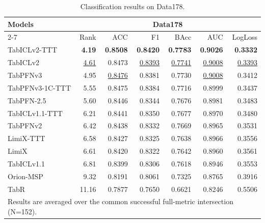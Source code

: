 \begin{table}[t]
\centering
\caption{Classification results on Data178.}
\label{tab:compare-results-all-metrics}
\begin{tabular}{lrrrrrr}
\hline
Models & \multicolumn{6}{c}{Data178} \\
\cline{2-7}
 & Rank & ACC & F1 & BAcc & AUC & LogLoss \\
\hline
TabICLv2-TTT & \textbf{4.19} & \textbf{0.8508} & \textbf{0.8420} & \textbf{0.7783} & \textbf{0.9026} & \textbf{0.3332} \\
TabICLv2 & \underline{4.61} & 0.8473 & \underline{0.8393} & \underline{0.7741} & \underline{0.9008} & \underline{0.3393} \\
TabPFNv3 & 4.95 & \underline{0.8476} & 0.8381 & 0.7730 & \underline{0.9008} & 0.3412 \\
TabPFNv3-1C-TTT & 5.55 & 0.8475 & 0.8384 & 0.7716 & 0.8999 & 0.3437 \\
TabPFN-2.5 & 5.60 & 0.8446 & 0.8344 & 0.7676 & 0.8981 & 0.3483 \\
TabICLv1.1-TTT & 6.21 & 0.8441 & 0.8350 & 0.7677 & 0.8970 & 0.3480 \\
TabPFNv2 & 6.42 & 0.8438 & 0.8332 & 0.7669 & 0.8965 & 0.3531 \\
LimiX-TTT & 6.58 & 0.8427 & 0.8325 & 0.7638 & 0.8966 & 0.3556 \\
LimiX & 6.61 & 0.8420 & 0.8322 & 0.7642 & 0.8960 & 0.3561 \\
TabICLv1.1 & 6.81 & 0.8399 & 0.8306 & 0.7618 & 0.8946 & 0.3553 \\
Orion-MSP & 9.32 & 0.8191 & 0.8061 & 0.7325 & 0.8765 & 0.3916 \\
TabR & 11.16 & 0.7877 & 0.7650 & 0.6621 & 0.8246 & 0.5506 \\
\hline
\multicolumn{7}{l}{\footnotesize Results are averaged over the common successful full-metric intersection (N=152).} \\
\end{tabular}
\end{table}
